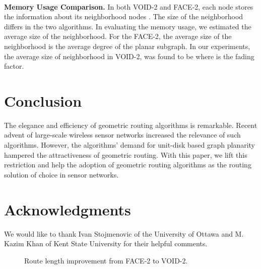\documentclass[conference]{IEEEtran}
\begin{document}
\ \\ \textbf{Memory Usage Comparison.} In both VOID-2 and FACE-2, each
node  stores the information about its neighborhood nodes .
The size of the neighborhood differs in the two algorithms. In
evaluating the memory usage, we estimated the average size of the
neighborhood. For the FACE-2, the average size of the neighborhood is
the average degree  of the planar subgraph. In our experiments, the
average size of neighborhood in VOID-2, was found to be 
where  is the fading factor.


\section{Conclusion}
\label{SecConclusion}

The elegance and efficiency of geometric routing algorithms is
remarkable. Recent advent of large-scale wireless sensor networks
increased the relevance of such algorithms. However, the algorithms'
demand for unit-disk based graph planarity hampered the attractiveness
of geometric routing.  With this paper, we lift this restriction and
help the adoption of geometric routing algorithms as the routing
solution of choice in sensor networks.


\section*{Acknowledgments} We would like to thank Ivan Stojmenovic
of the University of Ottawa and M. Kazim Khan of Kent State University
for their helpful comments.

\suppressfloats[t]

\begin{figure}[t]
\center {}
\caption{Route length improvement from FACE-2 to VOID-2.}
\label{figCompare}
\end{figure}





\end{document}
